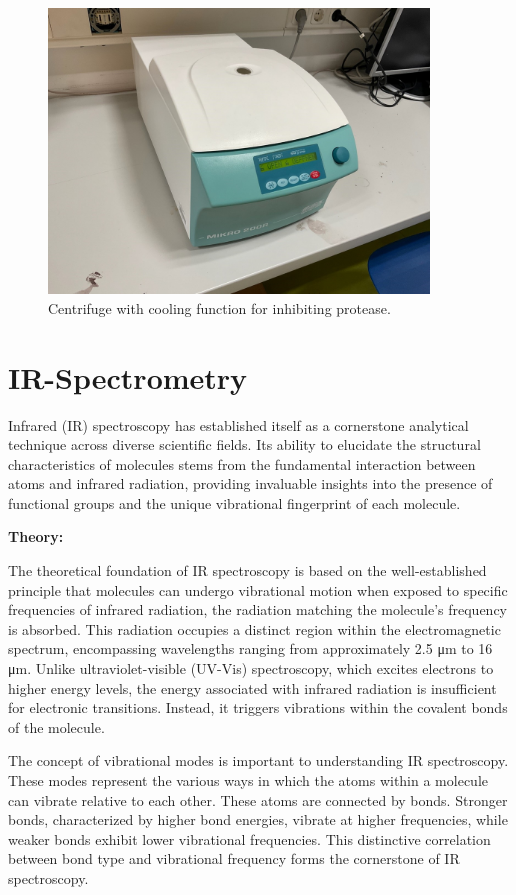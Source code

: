 \begin{figure}[H]
    \centering
    \includegraphics[width=0.9\textwidth]{./media/images/centrifuge_cooling}
    \caption{Centrifuge with cooling function for inhibiting protease.}
    \label{fig:centrifuge_cooling}
\end{figure}


\section{IR-Spectrometry}
Infrared (IR) spectroscopy has established itself as a cornerstone analytical technique across diverse scientific fields.
Its ability to elucidate the structural characteristics of molecules stems from the fundamental interaction between atoms and infrared radiation, providing invaluable insights into the presence of functional groups and the unique vibrational fingerprint of each molecule.

\textbf{Theory:}

The theoretical foundation of IR spectroscopy is based on the well-established principle that molecules can undergo vibrational motion when exposed to specific frequencies of infrared radiation, the radiation matching the molecule's frequency is absorbed.
This radiation occupies a distinct region within the electromagnetic spectrum, encompassing wavelengths ranging from approximately 2.5 μm to 16 μm.
Unlike ultraviolet-visible (UV-Vis) spectroscopy, which excites electrons to higher energy levels, the energy associated with infrared radiation is insufficient for electronic transitions.
Instead, it triggers vibrations within the covalent bonds of the molecule.

The concept of vibrational modes is important to understanding IR spectroscopy.
These modes represent the various ways in which the atoms within a molecule can vibrate relative to each other.
These atoms are connected by bonds.
Stronger bonds, characterized by higher bond energies, vibrate at higher frequencies, while weaker bonds exhibit lower vibrational frequencies.
This distinctive correlation between bond type and vibrational frequency forms the cornerstone of IR spectroscopy.

